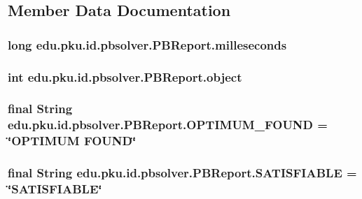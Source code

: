 \subsection{Member Data Documentation}
\hypertarget{classedu_1_1pku_1_1id_1_1pbsolver_1_1_p_b_report_a0b23c36991f0012e4c3263a49c13dd53}{
\subsubsection[{milleseconds}]{\setlength{\rightskip}{0pt plus 5cm}long {\bf edu.pku.id.pbsolver.PBReport.milleseconds}}}
\label{classedu_1_1pku_1_1id_1_1pbsolver_1_1_p_b_report_a0b23c36991f0012e4c3263a49c13dd53}
\hypertarget{classedu_1_1pku_1_1id_1_1pbsolver_1_1_p_b_report_a8377cb6e4e24f0e618a0fa9a8072aef9}{
\subsubsection[{object}]{\setlength{\rightskip}{0pt plus 5cm}int {\bf edu.pku.id.pbsolver.PBReport.object}}}
\label{classedu_1_1pku_1_1id_1_1pbsolver_1_1_p_b_report_a8377cb6e4e24f0e618a0fa9a8072aef9}
\hypertarget{classedu_1_1pku_1_1id_1_1pbsolver_1_1_p_b_report_a3dc03c88094c6d3b94f79d015dc91dbc}{
\subsubsection[{OPTIMUM\_\-FOUND}]{\setlength{\rightskip}{0pt plus 5cm}final String {\bf edu.pku.id.pbsolver.PBReport.OPTIMUM\_\-FOUND} = \char`\"{}OPTIMUM FOUND\char`\"{}}}
\label{classedu_1_1pku_1_1id_1_1pbsolver_1_1_p_b_report_a3dc03c88094c6d3b94f79d015dc91dbc}
\hypertarget{classedu_1_1pku_1_1id_1_1pbsolver_1_1_p_b_report_a94d85825eea60ee1d00b0b8df185b0f3}{
\subsubsection[{SATISFIABLE}]{\setlength{\rightskip}{0pt plus 5cm}final String {\bf edu.pku.id.pbsolver.PBReport.SATISFIABLE} = \char`\"{}SATISFIABLE\char`\"{}}}
